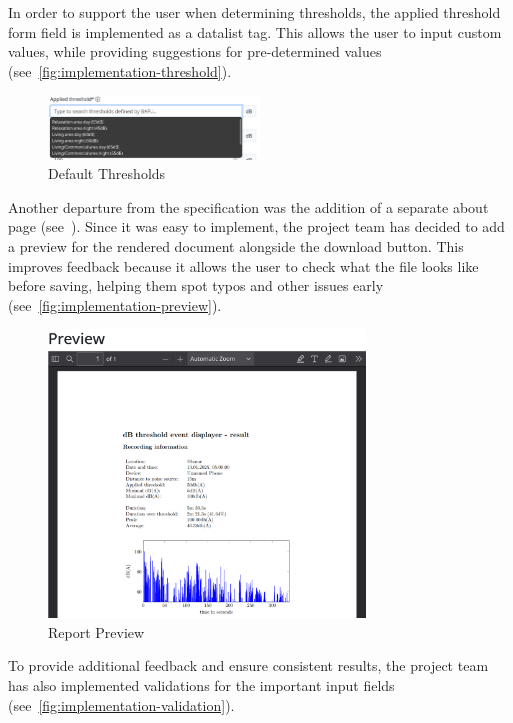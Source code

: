 In order to support the user when determining thresholds, the applied threshold form field is implemented as a datalist tag. This allows the user to input custom values, while
providing suggestions for pre-determined values (see~\autoref{fig:implementation-threshold}).
\begin{figure}[H]
    \centering
    \includegraphics[width=0.5\textwidth]{../assets/implementation_threshold.png}
    \caption{Default Thresholds}\label{fig:implementation-threshold}
\end{figure}
Another departure from the specification was the addition of a separate about page (see~). Since it was easy to implement,
the project team has decided to add a preview for the rendered document alongside the download button. This improves feedback because it allows the user to
check what the file looks like before saving, helping them spot typos and other issues early (see~\autoref{fig:implementation-preview}).
\begin{figure}[H]
    \centering
    \includegraphics[width=0.75\textwidth]{../assets/implementation_preview.png}
    \caption{Report Preview}\label{fig:implementation-preview}
\end{figure}
To provide additional feedback and ensure consistent results, the project team has also implemented
validations for the important input fields (see~\autoref{fig:implementation-validation}).
